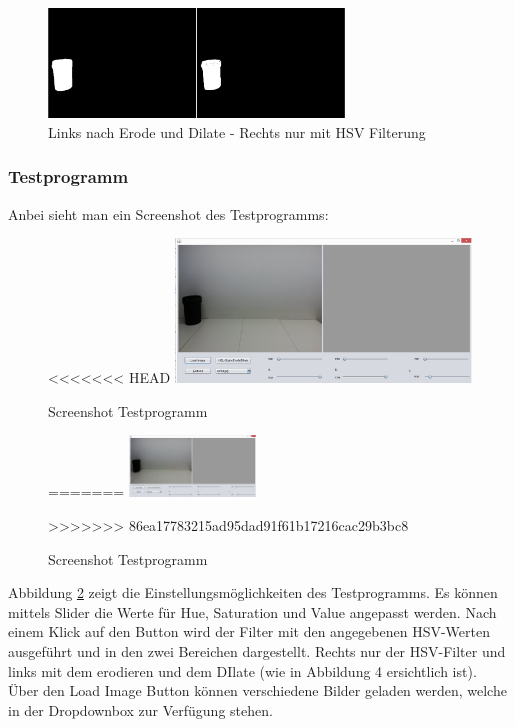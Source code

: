\begin{figure}[h!]
	\centering
	\includegraphics[width=0.7\textwidth]{fig/Korberkennung1.png}
	\caption{Links nach Erode und Dilate - Rechts nur mit HSV Filterung}
	\label{fig:Korb_Erkennung}
\end{figure}

\subsubsection{Testprogramm}
Anbei sieht man ein Screenshot des Testprogramms:
\begin{figure}[h!]
<<<<<<< HEAD
	\centering
	\includegraphics[width=0.7\textwidth]{fig/Testprogramm.png}
	\caption{Screenshot Testprogramm}
	\label{fig:Korb_Testprogramm}
=======
    \centering
    \includegraphics[width=0.3\textwidth]{fig/Testprogramm.png}
    \caption{Screenshot Testprogramm}
    \label{fig:Korb_Testprogramm}
>>>>>>> 86ea17783215ad95dad91f61b17216cac29b3bc8
\end{figure}

Abbildung \ref{fig:Korb_Testprogramm} zeigt die Einstellungsmöglichkeiten des 
Testprogramms. Es können mittels Slider die Werte für Hue, Saturation und 
Value angepasst werden. Nach einem Klick auf den Button wird der Filter mit 
den angegebenen HSV-Werten ausgeführt und in den zwei Bereichen dargestellt. 
Rechts nur der HSV-Filter und links mit dem erodieren und dem DIlate (wie in 
Abbildung 4 ersichtlich ist). \\
Über den Load Image Button können verschiedene Bilder geladen werden, welche 
in der Dropdownbox zur Verfügung stehen.
